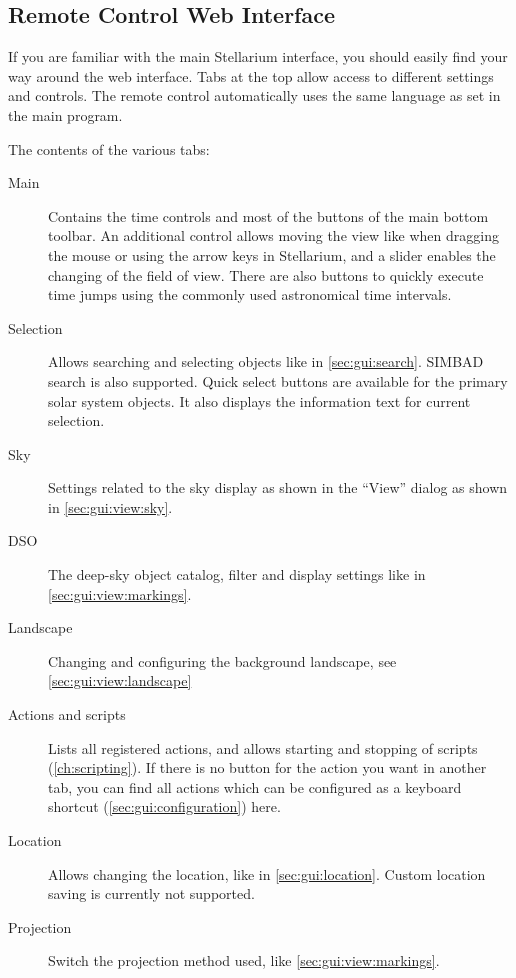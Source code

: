 \subsection{Remote Control Web Interface}
\label{sec:plugins:RemoteControl:webinterface}


If you are familiar with the main Stellarium interface, you should easily find 
your way around the web interface. Tabs at the top allow access to 
different settings and controls. The remote control automatically uses the 
same language as set in the main program.

The contents of the various tabs:
\begin{description}
\item[Main] Contains the time controls and most of the buttons of the 
main bottom toolbar. An additional control allows moving the view like when 
dragging the mouse or using the arrow keys in Stellarium, and a slider enables 
the changing of the field of view. There are also buttons to quickly execute 
time jumps using the commonly used astronomical time intervals.
\item[Selection] Allows searching and selecting objects like in \autoref{sec:gui:search}. 
SIMBAD search is also supported. Quick select buttons are available for the 
primary solar system objects. It also displays the information text for current 
selection.
\item[Sky] Settings related to the sky display as shown in the ``View'' dialog 
as shown in \autoref{sec:gui:view:sky}.
\item[DSO] The deep-sky object catalog, filter and display settings like in 
\autoref{sec:gui:view:markings}.
\item[Landscape] Changing and configuring the background landscape, see 
\autoref{sec:gui:view:landscape}
\item[Actions and scripts] Lists all registered actions, and allows starting 
and stopping of scripts (\autoref{ch:scripting}). If there is no button for the 
action you want in another tab, you can find all actions which can be 
configured as a keyboard shortcut (\autoref{sec:gui:configuration}) here.
\item[Location] Allows changing the location, like in 
\autoref{sec:gui:location}. Custom location saving is currently not 
supported.
\item[Projection] Switch the projection method used, like \autoref{sec:gui:view:markings}.
\end{description}

